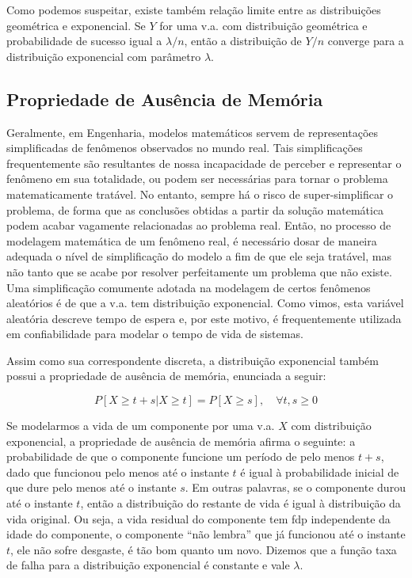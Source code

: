 \documentclass[
]{book}
\theoremstyle{definition}
\theoremstyle{definition}
\theoremstyle{definition}
\theoremstyle{remark}
\begin{document}
Como podemos suspeitar, existe também relação limite entre as distribuições geométrica e exponencial. Se \(Y\) for uma v.a. com distribuição geométrica e probabilidade de sucesso igual a \(\lambda/n\), então a distribuição de \(Y/n\) converge para a distribuição exponencial com parâmetro \(\lambda\).

\hypertarget{propriedade-de-ausuxeancia-de-memuxf3ria-1}{%
\subsection*{Propriedade de Ausência de Memória}\label{propriedade-de-ausuxeancia-de-memuxf3ria-1}}

Geralmente, em Engenharia, modelos matemáticos servem de representações simplificadas de fenômenos observados no mundo real. Tais simplificações frequentemente são resultantes de nossa incapacidade de perceber e representar o fenômeno em sua totalidade, ou podem ser necessárias para tornar o problema matematicamente tratável. No entanto, sempre há o risco de super-simplificar o problema, de forma que as conclusões obtidas a partir da solução matemática podem acabar vagamente relacionadas ao problema real. Então, no processo de modelagem matemática de um fenômeno real, é necessário dosar de maneira adequada o nível de simplificação do modelo a fim de que ele seja tratável, mas não tanto que se acabe por resolver perfeitamente um problema que não existe. Uma simplificação comumente adotada na modelagem de certos fenômenos aleatórios é de que a v.a. tem distribuição exponencial. Como vimos, esta variável aleatória descreve tempo de espera e, por este motivo, é frequentemente utilizada em confiabilidade para modelar o tempo de vida de sistemas.

Assim como sua correspondente discreta, a distribuição exponencial também possui a propriedade de ausência de memória, enunciada a seguir:

\[P[X \geq t + s | X \geq t]  = P [X \geq s], \quad \forall t, s \geq 0\]

Se modelarmos a vida de um componente por uma v.a. \(X\) com distribuição exponencial, a propriedade de ausência de memória afirma o seguinte: a probabilidade de que o componente funcione um período de pelo menos \(t+s\), dado que funcionou pelo menos até o instante \(t\) é igual à probabilidade inicial de que dure pelo menos até o instante \(s\). Em outras palavras, se o componente durou até o instante \(t\), então a distribuição do restante de vida é igual à distribuição da vida original. Ou seja, a vida residual do componente tem fdp independente da idade do componente, o componente ``não lembra'' que já funcionou até o instante \(t\), ele não sofre desgaste, é tão bom quanto um novo. Dizemos que a função taxa de falha para a distribuição exponencial é constante e vale \(\lambda\).
\end{document}
